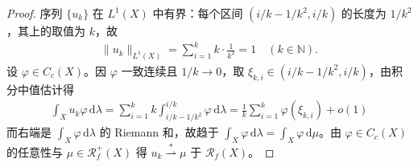 \documentclass[../../main.tex]{subfiles}
\begin{document}
\begin{proof}
序列 $\{u_k\}$ 在 $L^1(X)$ 中有界：每个区间 $(i/k-1/k^2,i/k)$ 的长度为 $1/k^2$，其上的取值为 $k$，故
\begin{align*}
\|u_k\|_{L^1(X)}=\sum_{i=1}^kk\cdot\frac1{k^2}=1\quad(k\in\mathbb{N}).
\end{align*}
设 $\varphi\in C_c(X)$。因 $\varphi$ 一致连续且 $1/k\to0$，取 $\xi_{k,i}\in(i/k-1/k^2,i/k)$，由积分中值估计得
\begin{align*}
\int_Xu_k\varphi\,\mathrm{d}\lambda
=\sum_{i=1}^kk\int_{i/k-1/k^2}^{i/k}\varphi\,\mathrm{d}\lambda
=\frac1k\sum_{i=1}^k\varphi(\xi_{k,i})+o(1)
\end{align*}
而右端是 $\int_X\varphi\,\mathrm{d}\lambda$ 的 Riemann 和，故趋于 $\int_X\varphi\,\mathrm{d}\lambda=\int_X\varphi\,\mathrm{d}\mu$。由 $\varphi\in C_c(X)$ 的任意性与 $\mu\in\mathscr{R}^+_f(X)$ 得 $u_k\stackrel{*}{\rightharpoonup}\mu$ 于 $\mathscr{R}_f(X)$。
\end{proof}
\end{document}
